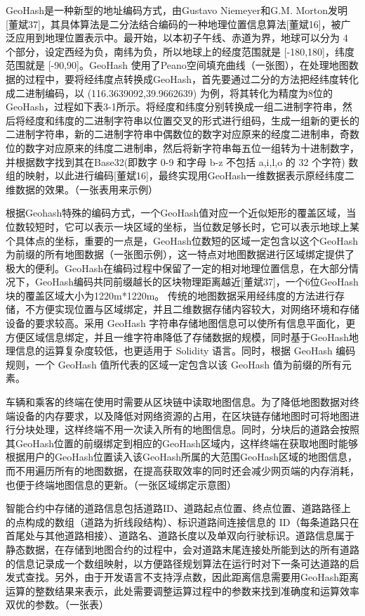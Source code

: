 GeoHash是一种新型的地址编码方式，由Gustavo Niemeyer和G.M. Morton发明[董斌37]，其具体算法是二分法结合编码的一种地理位置信息算法[董斌16]，被广泛应用到地理位置表示中。最开始，以本初子午线、赤道为界，地球可以分为 4 个部分，设定西经为负，南纬为负，所以地球上的经度范围就是 [-180,180]，纬度范围就是 [-90,90]。GeoHash 使用了Peano空间填充曲线（一张图），在处理地图数据的过程中，要将经纬度点转换成GeoHash，首先要通过二分的方法把经纬度转化成二进制编码，以 (116.3639092,39.9662639) 为例，将其转化为精度为8位的GeoHash，过程如下表3-1所示。将经度和纬度分别转换成一组二进制字符串，然后将经度和纬度的二进制字符串以位置交叉的形式进行组码，生成一组新的更长的二进制字符串，新的二进制字符串中偶数位的数字对应原来的经度二进制串，奇数位的数字对应原来的纬度二进制串，然后将新字符串每五位一组转为十进制数字，并根据数字找到其在Base32(即数字 0-9 和字母 b-z 不包括 a,i,l,o 的 32 个字符) 数组的映射，以此进行编码[董斌16]，最终实现用GeoHash一维数据表示原经纬度二维数据的效果。（一张表用来示例）

根据Geohash特殊的编码方式，一个GeoHash值对应一个近似矩形的覆盖区域，当位数较短时，它可以表示一块区域的坐标，当位数足够长时，它可以表示地球上某个具体点的坐标，重要的一点是，GeoHash位数短的区域一定包含以这个GeoHash为前缀的所有地图数据（一张图示例），这一特点对地图数据进行区域绑定提供了极大的便利。GeoHash在编码过程中保留了一定的相对地理位置信息，在大部分情况下，GeoHash编码共同前缀越长的区块物理距离越近[董斌37]，一个6位GeoHash块的覆盖区域大小为1220m*1220m。
传统的地图数据采用经纬度的方法进行存储，不方便实现位置与区域绑定，并且二维数据存储内容较大，对网络环境和存储设备的要求较高。采用 GeoHash 字符串存储地图信息可以使所有信息平面化，更方便区域信息绑定，并且一维字符串降低了存储数据的规模，同时基于GeoHash地理信息的运算复杂度较低，也更适用于 Solidity 语言。同时，根据 GeoHash 编码规则，一个 GeoHash 值所代表的区域一定包含以该 GeoHash 值为前缀的所有元素。

车辆和乘客的终端在使用时需要从区块链中读取地图信息。为了降低地图数据对终端设备的内存要求，以及降低对网络资源的占用，在区块链存储地图时可将地图进行分块处理，这样终端不用一次读入所有的地图信息。同时，分块后的道路会按照其GeoHash位置的前缀绑定到相应的GeoHash区域内，这样终端在获取地图时能够根据用户的GeoHash位置读入该GeoHash所属的大范围GeoHash区域的地图信息，而不用遍历所有的地图数据，在提高获取效率的同时还会减少网页端的内存消耗，也便于终端地图信息的更新。（一张区域绑定示意图）

智能合约中存储的道路信息包括道路ID、道路起点位置、终点位置、道路路径上的点构成的数组（道路为折线段结构）、标识道路间连接信息的 ID（每条道路只在首尾处与其他道路相接）、道路名、道路长度以及单双向行驶标识。道路信息属于静态数据，在存储到地图合约的过程中，会对道路末尾连接处所能到达的所有道路的信息记录成一个数组映射，以方便路径规划算法在运行时对下一条可达道路的启发式查找。另外，由于开发语言不支持浮点数，因此距离信息需要用GeoHash距离运算的整数结果来表示，此处需要调整运算过程中的参数来找到准确度和运算效率双优的参数。（一张表）

